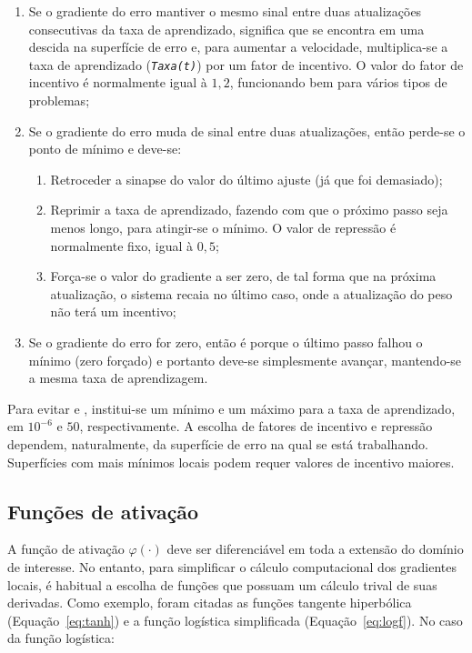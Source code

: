 \begin{enumerate}
\item Se o gradiente do erro mantiver o mesmo sinal entre duas
atualizações consecutivas da taxa de aprendizado, significa que se encontra em
uma descida na superfície de erro e, para aumentar a velocidade,
multiplica-se a taxa de aprendizado (\texttt{\textit{Taxa(t)}}) por um fator
de incentivo. O valor do fator de incentivo é normalmente igual à $1,2$,
funcionando bem para vários tipos de problemas;
\item Se o gradiente do erro muda de sinal entre duas atualizações, então
perde-se o ponto de mínimo e deve-se:
\begin{enumerate}
\item Retroceder a sinapse do valor do último ajuste (já que foi demasiado);
\item Reprimir a taxa de aprendizado, fazendo com que o próximo passo seja
menos longo, para atingir-se o mínimo. O valor de repressão é normalmente
fixo, igual à $0,5$;
\item Força-se o valor do gradiente a ser zero, de tal forma que na próxima
atualização, o sistema recaia no último caso, onde a atualização do peso não
terá um incentivo;
\end{enumerate}
\item Se o gradiente do erro for zero, então é porque o último passo falhou
o mínimo (zero forçado) e portanto deve-se simplesmente avançar, mantendo-se a
mesma taxa de aprendizagem.
\end{enumerate}

Para evitar  e , institui-se um mínimo e um
máximo para a taxa de aprendizado, em $10^{-6}$ e $50$, respectivamente. A
escolha de fatores de incentivo e repressão dependem, naturalmente, da
superfície de erro na qual se está trabalhando. Superfícies com mais mínimos
locais podem requer valores de incentivo maiores.

\subsection{Funções de ativação} 

A função de ativação $\varphi(\cdot)$ deve ser diferenciável em toda a
extensão do domínio de interesse. No entanto, para simplificar o cálculo
computacional dos gradientes locais, é habitual a escolha de funções que
possuam um cálculo trival de suas derivadas. Como exemplo, foram citadas as
funções tangente hiperbólica (Equação~\ref{eq:tanh}) e a função logística
simplificada (Equação~\ref{eq:logf}). No caso da função logística:


